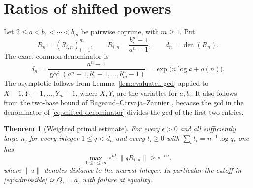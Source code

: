 \documentclass[11pt,a4paper,reqno]{amsart}
\newtheorem{theorem}{Theorem}[section]
\theoremstyle{definition}
\theoremstyle{remark}
\numberwithin{equation}{section}
\begin{document}
\section{Ratios of shifted powers}\label{sec:shifted-powers}

Let \(2\le a<b_1<\cdots<b_m\) be pairwise coprime, with \(m\ge1\).
Put
\begin{equation}\label{eq:shifted-ratios}
 R_n=(R_{i,n})_{i=1}^m,\qquad
 R_{i,n}=\frac{b_i^n-1}{a^n-1},\qquad d_n=\operatorname{den}(R_n).
\end{equation}
The exact common denominator is
\begin{equation}\label{eq:shifted-denominator}
 d_n=\frac{a^n-1}{\gcd(a^n-1,b_1^n-1,\ldots,b_m^n-1)}
     =\exp\bigl(n\log a+o(n)\bigr).
\end{equation}
The asymptotic follows from Lemma~\ref{lem:evaluated-gcd} applied
to \(X-1,Y_1-1,\ldots,Y_m-1\), where \(X,Y_i\) are the variables
for \(a,b_i\). It also follows from the two-base bound of
Bugeaud--Corvaja--Zannier \cite{BCZ}, because the gcd in the
denominator of \eqref{eq:shifted-denominator} divides the gcd
of the first two entries.

\begin{theorem}[Weighted primal estimate]\label{thm:primal}
For every \(\epsilon>0\) and all sufficiently large \(n\), for
every integer \(1\le q<d_n\) and every \(t_i\ge0\) with
\(\sum_i t_i=n^{-1}\log q\), one has
\begin{equation}\label{eq:weighted-primal}
 \max_{1\le i\le m} e^{nt_i}\|qR_{i,n}\|\ge e^{-\epsilon n},
\end{equation}
where \(\|u\|\) denotes distance to the nearest integer.
In particular the cutoff in \eqref{eq:admissible} is \(Q_*=a\),
with failure at equality.
\end{theorem}
\end{document}
